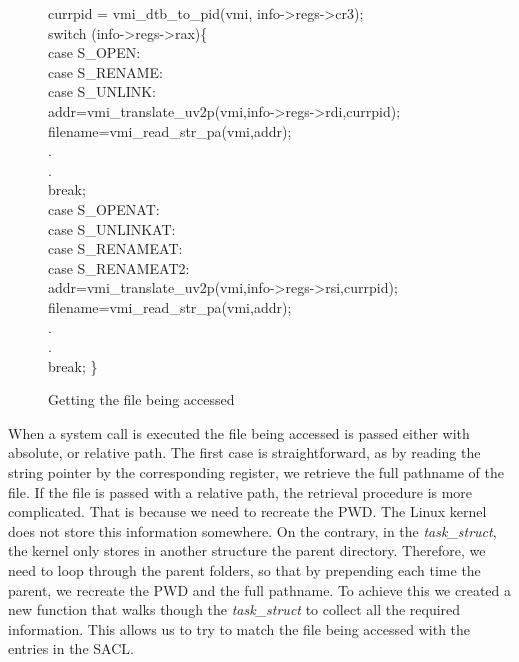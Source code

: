 \begin{figure}[ht]
\footnotesize {
	{\selectfont 
currpid = vmi\_dtb\_to\_pid(vmi, info->regs->cr3);\\
switch (info->regs->rax)\{\\
case S\_OPEN:\\
case S\_RENAME:\\
case S\_UNLINK:\\
\tab	addr=vmi\_translate\_uv2p(vmi,info->regs->rdi,currpid);\\
\tab	filename=vmi\_read\_str\_pa(vmi,addr);\\
\tab	.\\
\tab	.\\
\tab	break;\\
case S\_OPENAT:\\
case S\_UNLINKAT:\\
case S\_RENAMEAT:\\
case S\_RENAMEAT2:\\
\tab	addr=vmi\_translate\_uv2p(vmi,info->regs->rsi,currpid);\\
\tab	filename=vmi\_read\_str\_pa(vmi,addr);\\
\tab	.\\
\tab	.\\
\tab	break; \} \\
	}
}
	\caption{Getting the file being accessed}
	\label{fig:getfile}
\end{figure}


\par When a system call is executed the file being accessed is passed either with absolute, or relative path. The first case is straightforward, as by reading the string pointer by the corresponding register, we retrieve the full pathname of the file. If the file is passed with a relative path, the retrieval procedure is more complicated. That is because we need to recreate the \ac{PWD}. The Linux kernel does not store this information somewhere. On the contrary, in the \textit{task\_struct}, the kernel only stores in another structure the parent directory. Therefore, we need to loop through the parent folders, so that by prepending each time the parent, we recreate the \ac{PWD} and the full pathname. To achieve this we created a new function that walks though the \emph{task\_struct} to collect all the required information. This allows us to try to match the file being accessed with the entries in the \ac{SACL}.

